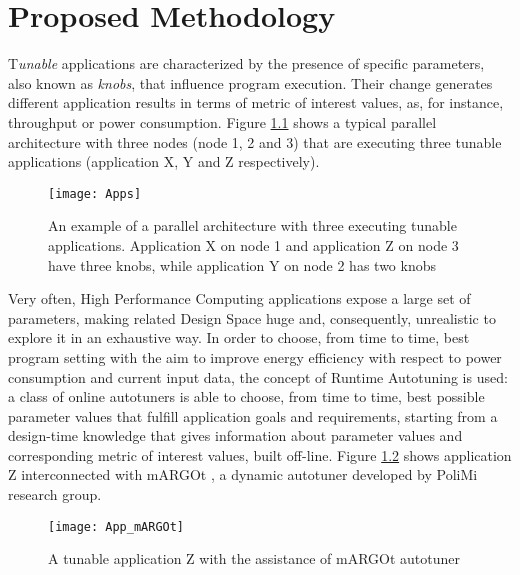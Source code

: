 \chapter{Proposed Methodology}\label{methodology}

\lettrine{T}{}\textit{unable} applications are characterized by the presence of specific parameters, also known as \textit{knobs}, that influence program execution. Their change generates different application results in terms of metric of interest values, as, for instance, throughput or power consumption. Figure \ref{fig::appDef} shows a typical parallel architecture with three nodes (node 1, 2 and 3) that are executing three tunable applications (application X, Y and Z respectively).

\begin{figure}[htb]

    \centering
    \texttt{[image: Apps]}

    \caption[An example of a parallel architecture with tunable applications]{An example of a parallel architecture with three executing tunable applications. Application X on node 1 and application Z on node 3 have three knobs, while application Y on node 2 has two knobs}
    \label{fig::appDef}
    
\end{figure}

Very often, High Performance Computing applications expose a large set of parameters, making related Design Space huge and, consequently, unrealistic to explore it in an exhaustive way. In order to choose, from time to time, best program setting with the aim to improve energy efficiency with respect to power consumption and current input data, the concept of Runtime Autotuning is used: a class of online autotuners is able to choose, from time to time, best possible parameter values that fulfill application goals and requirements, starting from a design-time knowledge that gives information about parameter values and corresponding metric of interest values, built off-line. Figure \ref{fig::appAut} shows application Z interconnected with mARGOt \cite{gadioli2015application}, a dynamic autotuner developed by PoliMi research group.

\begin{figure}[htb]

    \centering
    \texttt{[image: App\_mARGOt]}
    \caption{A tunable application Z with the assistance of mARGOt autotuner}
    \label{fig::appAut}
    
\end{figure}


